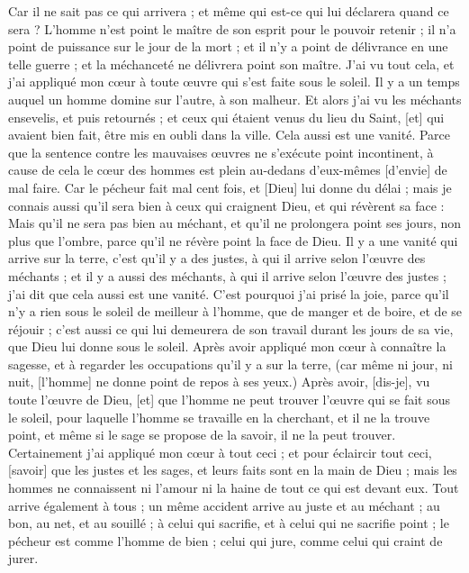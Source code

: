 \begin{multicols}{2}
Car il ne sait pas ce qui arrivera ; et même qui est-ce qui lui déclarera quand ce sera ?
L'homme n'est point le maître de son esprit pour le pouvoir retenir ; il n'a point de puissance sur le jour de la mort ; et il n'y a point de délivrance en une telle guerre ; et la méchanceté ne délivrera point son maître.
J'ai vu tout cela, et j'ai appliqué mon cœur à toute œuvre qui s'est faite sous le soleil. Il y a un temps auquel un homme domine sur l'autre, à son malheur.
Et alors j'ai vu les méchants ensevelis, et puis retournés ; et ceux qui étaient venus du lieu du Saint, [et] qui avaient bien fait, être mis en oubli dans la ville. Cela aussi est une vanité.
Parce que la sentence contre les mauvaises œuvres ne s'exécute point incontinent, à cause de cela le cœur des hommes est plein au-dedans d'eux-mêmes [d'envie] de mal faire.
Car le pécheur fait mal cent fois, et [Dieu] lui donne du délai ; mais je connais aussi qu'il sera bien à ceux qui craignent Dieu, et qui révèrent sa face :
Mais qu'il ne sera pas bien au méchant, et qu'il ne prolongera point ses jours, non plus que l'ombre, parce qu'il ne révère point la face de Dieu.
Il y a une vanité qui arrive sur la terre, c'est qu'il y a des justes, à qui il arrive selon l'œuvre des méchants ; et il y a aussi des méchants, à qui il arrive selon l'œuvre des justes ; j'ai dit que cela aussi est une vanité.
C'est pourquoi j'ai prisé la joie, parce qu'il n'y a rien sous le soleil de meilleur à l'homme, que de manger et de boire, et de se réjouir ; c'est aussi ce qui lui demeurera de son travail durant les jours de sa vie, que Dieu lui donne sous le soleil.
Après avoir appliqué mon cœur à connaître la sagesse, et à regarder les occupations qu'il y a sur la terre, (car même ni jour, ni nuit, [l'homme] ne donne point de repos à ses yeux.)
Après avoir, [dis-je], vu toute l'œuvre de Dieu, [et] que l'homme ne peut trouver l'œuvre qui se fait sous le soleil, pour laquelle l'homme se travaille en la cherchant, et il ne la trouve point, et même si le sage se propose de la savoir, il ne la peut trouver.
\VerseOne{}Certainement j'ai appliqué mon cœur à tout ceci ; et pour éclaircir tout ceci, [savoir] que les justes et les sages, et leurs faits sont en la main de Dieu ; mais les hommes ne connaissent ni l'amour ni la haine de tout ce qui est devant eux.
Tout arrive également à tous ; un même accident arrive au juste et au méchant ; au bon, au net, et au souillé ; à celui qui sacrifie, et à celui qui ne sacrifie point ; le pécheur est comme l'homme de bien ; celui qui jure, comme celui qui craint de jurer.

\end{multicols}
